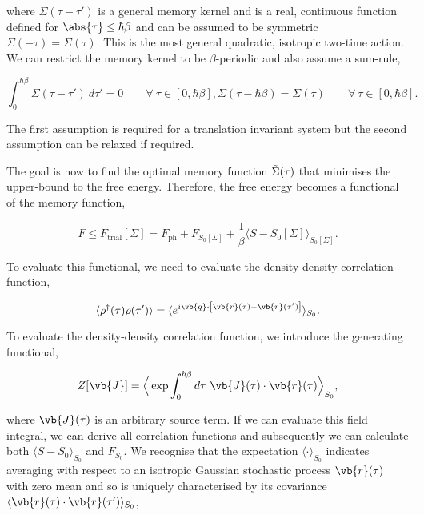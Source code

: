 where $\Sigma(\tau - \tau')$ is a general memory kernel and is a real, continuous function defined for $\abs{\tau} \leq \hbar\beta$ and can be assumed to be symmetric $\Sigma(-\tau) = \Sigma(\tau)$. This is the most general quadratic, isotropic two-time action. We can restrict the memory kernel to be $\beta$-periodic and also assume a sum-rule,

\begin{subequations}
    \begin{equation}
        \int_0^{\hbar\beta} \Sigma(\tau - \tau')\ d\tau' = 0 \qquad \forall\ \tau \in [0, \hbar\beta],
    \end{equation}
    \begin{equation}
        \Sigma(\tau - \hbar\beta) = \Sigma(\tau) \qquad \forall\ \tau \in [0, \hbar\beta].
    \end{equation}
\end{subequations}

The first assumption is required for a translation invariant system but the second assumption can be relaxed if required. 
\newline

The goal is now to find the optimal memory function $\Tilde{\Sigma}(\tau)$ that minimises the upper-bound to the free energy. Therefore, the free energy becomes a functional of the memory function,

\begin{equation}
    F \leq F_{\text{trial}} \left[ \Sigma \right] = F_{\text{ph}} + F_{S_0[\Sigma]} + \frac{1}{\beta} \langle S - S_0[\Sigma] \rangle_{S_0[\Sigma]}.
\end{equation}

To evaluate this functional, we need to evaluate the density-density correlation function,

\begin{equation}
    \langle \rho^{\dagger}(\tau) \rho(\tau') \rangle = \langle e^{i \vb{q} \cdot \left[ \vb{r}(\tau) - \vb{r}(\tau') \right]} \rangle_{S_0} .
\end{equation}

To evaluate the density-density correlation function, we introduce the generating functional,

\begin{equation}
    Z[\vb{J}] = \Big\langle \exp{\int_0^{\hbar\beta} d\tau\ \vb{J}(\tau) \cdot \vb{r}(\tau) } \Big\rangle_{S_0},
\end{equation}

where $\vb{J}(\tau)$ is an arbitrary source term. If we can evaluate this field integral, we can derive all correlation functions and subsequently we can calculate both $\langle S - S_0 \rangle_{S_0}$ and $F_{S_0}$. We recognise that the expectation $\langle \cdot \rangle_{S_0}$ indicates averaging with respect to an isotropic Gaussian stochastic process $\vb{r}(\tau)$ with zero mean and so is uniquely characterised by its covariance $\langle \vb{r}(\tau) \cdot \vb{r}(\tau') \rangle_{S_0}$,

